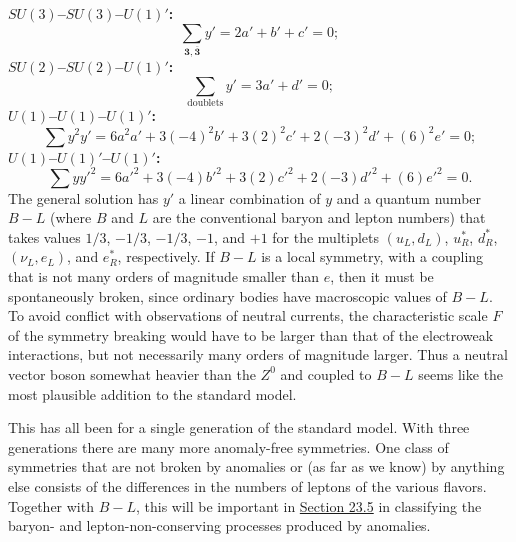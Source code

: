 \noindent\textbf{\boldmath$SU(3)$--$SU(3)$--$U(1)'$:}
\[
 \sum_{\mathbf3,\overline{\mathbf3}}y'=2a'+b'+c'=0;
\]
\noindent\textbf{\boldmath$SU(2)$--$SU(2)$--$U(1)'$:}
\[
 \sum_{\text{doublets}}y'=3a'+d'=0;
\]
\noindent\textbf{\boldmath$U(1)$--$U(1)$--$U(1)'$:}
\[
 \sum y^2y'
 =6a^2a'+3(-4)^2b'+3(2)^2c'+2(-3)^2d'+(6)^2e'=0;
\]
\noindent\textbf{\boldmath$U(1)$--$U(1)'$--$U(1)'$:}
\[
 \sum y{y'}^2
 =6{a'}^2+3(-4){b'}^2+3(2){c'}^2
 +2(-3){d'}^2+(6){e'}^2=0.
\]
The general solution has $y'$ a linear combination of $y$ and a quantum
number $B-L$ (where $B$ and $L$ are the conventional baryon and lepton
numbers) that takes values $1/3$, $-1/3$, $-1/3$, $-1$, and $+1$ for the
multiplets $(u_L,d_L)$, $u_R^*$, $d_R^*$, $(\nu_L,e_L)$, and $e_R^*$,
respectively. If $B-L$ is a local symmetry, with a coupling that is not
many orders of magnitude smaller than $e$, then it must be spontaneously
broken, since ordinary bodies have macroscopic values of $B-L$. To avoid
conflict with observations of neutral currents, the characteristic scale
$F$ of the symmetry breaking would have to be larger than that of the
electroweak interactions, but not necessarily many orders of magnitude
larger. Thus a neutral vector boson somewhat heavier than the $Z^0$ and
coupled to $B-L$ seems like the most plausible addition to the standard
model.

This has all been for a single generation of the standard model. With
three generations there are many more anomaly-free symmetries. One class
of symmetries that are not broken by anomalies or (as far as we know) by
anything else consists of the differences in the numbers of leptons of the
various flavors. Together with $B-L$, this will be important in
\hyperref[sec:23.5]{Section 23.5} in classifying the baryon- and
lepton-non-conserving processes produced by anomalies.
